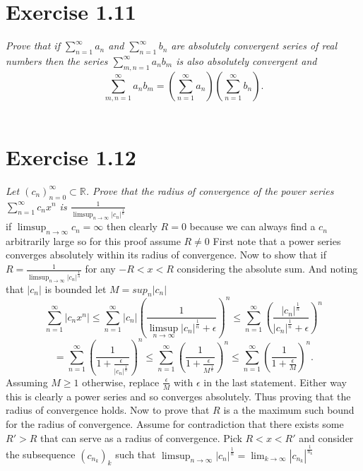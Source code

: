 \documentclass{amsart}
\begin{document}
        \section{Exercise 1.11}
        \emph{
            Prove that if $\sum_{n=1}^{\infty}a_n$ and $\sum_{n=1}^{\infty}b_n$ are absolutely convergent
            series of real numbers then the series $\sum_{m,n=1}^{\infty}a_nb_m$ is also absolutely convergent
            and 
            \[
            \sum_{m,n=1}^{\infty}a_nb_m = (\sum_{n=1}^{\infty}a_n)(\sum_{n=1}^{\infty}b_n)
            .\] 
        }\\
        \section{Exercise 1.12}
        \emph{
            Let $(c_n)_{n=0}^{\infty} \subset \mathbb{R}$. Prove that the radius of convergence of the power series 
            $\sum_{n=1}^{\infty}c_nx^{n}$ is $\frac{1}{\limsup_{n\to \infty}|c_n|^{\frac{1}{n}}}$
        }\\
        if $\limsup_{n\to \infty}c_n = \infty$ then clearly $R = 0$ because we can always find a $c_n$ arbitrarily large so for this proof assume $R \ne 0$
        First note that a power series converges absolutely within its radius of convergence.
        Now to show that if $R = \frac{1}{\limsup_{n\to \infty}|c_n|^{\frac{1}{n}}}$  for any $-R < x < R$ considering
        the absolute sum. And noting that $|c_n|$ is bounded let $M = sup_{n}|c_n|$
         \[
        \sum_{n=1}^{\infty}|c_nx^{n}| \le \sum_{n=1}^{\infty}|c_n|(\frac{1}{\limsup_{n\to \infty}|c_n|^{\frac{1}{n}} + \epsilon})^{n} \le \sum_{n=1}^{\infty}(\frac{|c_n|^{\frac{1}{n}}}{|c_n|^{\frac{1}{n}}+\epsilon})^{n} 
        \] 
        \[
        = \sum_{n=1}^{\infty}(\frac{1}{1+\frac{\epsilon}{|c_n|^{\frac{1}{n}}}})^{n} \le \sum_{n=1}^{\infty}(\frac{1}{1+\frac{\epsilon}{M^{\frac{1}{n}}}})^{n} \le \sum_{n=1}^{\infty}(\frac{1}{1+\frac{\epsilon}{M}})^{n}
        .\] 
        Assuming $M \ge 1$ otherwise, replace  $\frac{\epsilon}{M}$ with $\epsilon$ in the last statement.
        Either way this is clearly a power series and so converges absolutely. Thus proving that the radius of convergence holds.
        Now to prove that $R$ is a the maximum such bound for the radius of convergence.
        Assume for contradiction that there exists some $R' > R$ that can serve as a radius of convergence.
        Pick $R < x < R' $ and consider the subsequence  $(c_{n_k})_k$ such that $\limsup_{n\to \infty}|c_n|^{\frac{1}{n}} = \lim_{k\to \infty}|c_{n_k}|^{\frac{1}{n_k}}$
\end{document}
